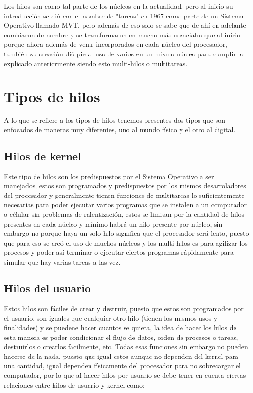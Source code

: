 \documentclass[letterpaper]{article}
\begin{document}
Los hilos son como tal parte de los núcleos en la actualidad, pero al inicio su introducción se dió con el nombre de "tareas" en 1967 como parte de un Sistema Operativo llamado MVT, pero además de eso solo se sabe que de ahí en adelante cambiaron de nombre y se transformaron en mucho más esenciales que al inicio porque ahora además de venir incorporados en cada núcleo del procesador, también su creación dió pie al uso de varios en un mismo núcleo para cumplir lo explicado anteriormente siendo esto multi-hilos o multitareas.

\section{Tipos de hilos}

A lo que se refiere a los tipos de hilos tenemos presentes dos tipos que son enfocados de maneras muy diferentes, uno al mundo físico y el otro al digital.


\subsection{Hilos de kernel}
Este tipo de hilos son los predispuestos por el Sistema Operativo a ser manejados, estos son programados y predispuestos por los mismos desarroladores del procesador y generalmente tienen funciones de multitareas lo suficientemente necesarias para poder ejecutar varios programas que se instalen a un computador o célular sin problemas de ralentización, estos se limitan por la cantidad de hilos presentes en cada núcleo y mínimo habrá un hilo presente por núcleo, sin embargo no porque haya un solo hilo significa que el procesador será lento, puesto que para eso se creó el uso de muchos núcleos y los multi-hilos es para agilizar los procesos y poder así terminar o ejecutar ciertos programas rápidamente para simular que hay varias tareas a las vez.



\subsection{Hilos del usuario}

Estos hilos son fáciles de crear y destruir, puesto que estos son programados por el usuario, son iguales que cualquier otro hilo (tienen los mismos usos y finalidades) y se puedene hacer cuantos se quiera, la idea de hacer los hilos de esta manera es poder condicionar el flujo de datos, orden de procesos o tareas, destruirlos o crearlos facilmente, etc. Todas esas funciones sin embargo no pueden hacerse de la nada, puesto que igual estos aunque no dependen del kernel para una cantidad, igual dependen físicamente del procesador para no sobrecargar el computador, por lo que al hacer hilos por usuario se debe tener en cuenta ciertas relaciones entre hilos de usuario y kernel como:
\end{document}
